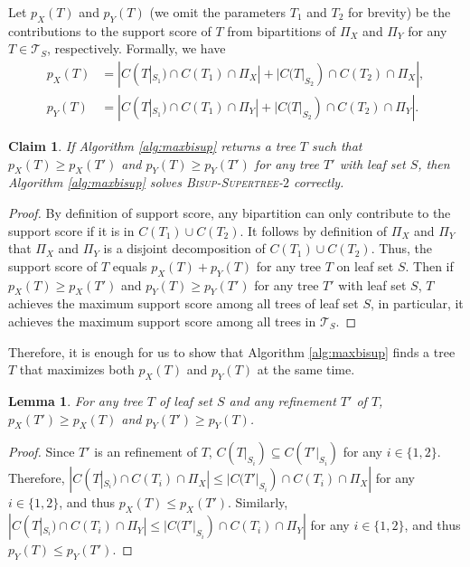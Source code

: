\documentclass{bmcart}
\newcommand{\bisuptwo}{\textsc{Bisup-Supertree-$2$}\xspace}
\newtheorem{lemma}{Lemma}
\newtheorem{claim}{Claim}
\begin{document}
Let $p_X(T)$ and $p_Y(T)$ (we omit the parameters $T_1$ and $T_2$ for brevity) be the contributions to the support score of $T$ from bipartitions of $\Pi_X$ and $\Pi_Y$ for any $T \in \mathcal{T}_S$, respectively. Formally, we have 
\begin{align*}
    p_X(T) &= |C(T|_{S_1}) \cap C(T_1) \cap \Pi_X| + |C(T|_{S_2}) \cap C(T_2) \cap \Pi_X|,\\
    p_Y(T) &= |C(T|_{S_1}) \cap C(T_1) \cap \Pi_Y| + |C(T|_{S_2}) \cap C(T_2) \cap \Pi_Y|.
\end{align*}

\begin{claim} \label{claim:sum_score_solves_prob}
    If Algorithm \ref{alg:maxbisup} returns a tree $T$ such that $p_X(T) \ge p_X(T')$ and $p_Y(T) \ge p_Y(T')$ for any tree $T'$ with leaf set $S$, then Algorithm \ref{alg:maxbisup} solves \bisuptwo correctly.
\end{claim}
\begin{proof}
By definition of support score, any bipartition can only contribute to the support score if it is in $C(T_1) \cup C(T_2)$. It follows by definition of $\Pi_X$ and $\Pi_Y$ that $\Pi_X$ and $\Pi_Y$ is a disjoint decomposition of $C(T_1) \cup C(T_2)$. Thus, the support score of $T$ equals $p_X(T) + p_Y(T)$ for any tree $T$ on leaf set $S$. Then if $p_X(T) \ge p_X(T')$ and $p_Y(T) \ge p_Y(T')$ for any tree $T'$ with leaf set $S$, $T$ achieves the maximum support score among all trees of leaf set $S$, in particular, it achieves the maximum support score among all trees in $\mathcal{T}_S$.
\end{proof}
Therefore, it is enough for us to show that Algorithm \ref{alg:maxbisup} finds a tree $T$ that maximizes both $p_X(T)$ and $p_Y(T)$ at the same time.


\begin{lemma}\label{lem:refine_only_increases}
    For any tree $T$ of leaf set $S$ and any refinement $T'$ of $T$, $p_X(T')\ge p_X(T)$ and $p_Y(T') \ge p_Y(T)$.
\end{lemma}
\begin{proof}
    Since $T'$ is an refinement of $T$, $C(T|_{S_i}) \subseteq C(T'|_{S_i})$ for any $i \in \{1,2\}$. Therefore, $|C(T|_{S_i}) \cap C(T_i) \cap \Pi_X| \le |C(T'|_{S_i}) \cap C(T_i) \cap \Pi_X|$ for any $i \in \{1,2\}$, and thus $p_X(T) \le p_X(T')$. Similarly, $|C(T|_{S_i}) \cap C(T_i) \cap \Pi_Y| \le |C(T'|_{S_i}) \cap C(T_i) \cap \Pi_Y|$ for any $i \in \{1,2\}$, and thus $p_Y(T) \le p_Y(T')$.
\end{proof}
\end{document}
